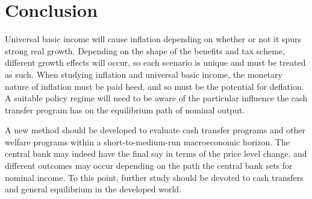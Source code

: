 \documentclass[paper=a4, fontsize=11pt,twoside]{scrartcl}
\begin{document}
\section{Conclusion}
Universal basic income will cause inflation depending on whether or not it spurs strong real growth. Depending on the shape of the benefits and tax scheme, different growth effects will occur, so each scenario is unique and must be treated as such. When studying inflation and universal basic income, the monetary nature of inflation must be paid heed, and so must be the potential for deflation. A suitable policy regime will need to be aware of the particular influence the cash transfer program has on the equilibrium path of nominal output. 

A new method should be developed to evaluate cash transfer programs and other welfare programs within a short-to-medium-run macroeconomic horizon. The central bank may indeed have the final say in terms of the price level change, and different outcomes may occur depending on the path the central bank sets for nominal income. To this point, further study should be devoted to cash transfers and general equilibrium in the developed world. 
\pagebreak
\printbibliography
\end{document}
